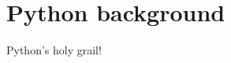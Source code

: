 %
%


\section[Python background]{Python background}

\begin{frame}{Python's holy grail!}
	
	
\end{frame}

